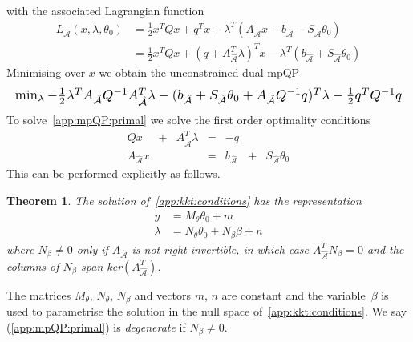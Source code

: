 \documentclass[journal]{IEEEtran}
\newcommand*{\Resize}[1]{\resizebox{\columnwidth}{!}{$#1$}}
\newcounter{thmcount}
\newtheorem{thm}[thmcount]{Theorem}
\theoremstyle{remark}
\theoremstyle{definition}
\begin{document}
%
with the associated Lagrangian function
%
\begin{equation}\begin{split}
  L_{\hat{\mathcal A}}(x,\lambda,\theta_0)  &= \frac{1}{2} x^T Q x +q^Tx + \lambda^T\left(A_{\hat{\mathcal A}}x - 
  b_{\hat{\mathcal A}} - S_{\hat{\mathcal A}}\theta_0\right)\\
  &=\frac{1}{2} x^T Q x + \left(q + A_{\hat{\mathcal A}}^T\lambda\right)^Tx 
  -\lambda^T \left(b_{\hat{\mathcal A}} + S_{\hat{\mathcal A}}\theta_0\right)
\end{split}\end{equation}
%
Minimising over $x$ we obtain the unconstrained dual mpQP
%
\begin{equation}\label{app:mpQP:dual}
  \Resize{\min_\lambda -\frac{1}{2}\lambda^T A_{\hat{\mathcal A}} Q^{-1}A_{\hat{\mathcal A}}^T \lambda 
  -(b_{\hat{\mathcal A}} + S_{\hat{\mathcal A}}\theta_0 + A_{\hat{\mathcal A}} Q^{-1}q)^T\lambda
  -\frac{1}{2}q^TQ^{-1}q}
\end{equation}
%
To solve~\eqref{app:mpQP:primal} we solve the first order optimality conditions
%
\begin{equation}\label{app:kkt:conditions}
  \begin{array}{ccccccc}
    Q x &+& A^T_{\hat{\mathcal A}}\lambda & = & -q && \\
    A_{\hat{\mathcal A}} x & & & = & b_{\hat{\mathcal A}}& +& S_{\hat{\mathcal A}}\theta_0
  \end{array}
\end{equation}
%
This can be performed explicitly as follows.
%
\begin{thm}\label{lem:mpQP:solution}
The solution of~\eqref{app:kkt:conditions} has the representation
\begin{equation}\label{app:mpQP:solution}
  \begin{split}
    y &= M_\theta \theta_0 + m\\
    \lambda &= N_\theta \theta_0 + N_\beta \beta + n
  \end{split}
\end{equation}
where $N_\beta\neq 0$ only if $A_{\hat{\mathcal A}}$ is not right invertible, in which case 
$A_{\hat{\mathcal A}}^TN_\beta=0$ and the columns of $N_\beta$ span ker$(A_{\hat{\mathcal A}}^T)$.
\end{thm}
%
The matrices $M_\theta$, $N_\theta$, $N_\beta$ and vectors $m$, $n$ are constant and the variable~$\beta$ 
is used to parametrise the solution in the null space of~\eqref{app:kkt:conditions}. 
%
We say (\ref{app:mpQP:primal}) is \emph{degenerate} if $N_\beta\neq 0$.
\end{document}
